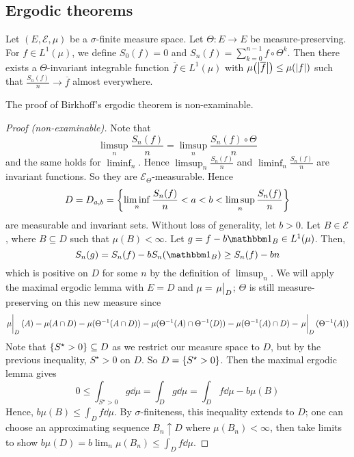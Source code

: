 \subsection{Ergodic theorems}
\begin{theorem}[Birkhoff]
	Let \( (E, \mathcal E, \mu) \) be a \( \sigma \)-finite measure space.
	Let \( \Theta \colon E \to E \) be measure-preserving.
	For \( f \in L^1(\mu) \), we define \( S_0(f) = 0 \) and \( S_n(f) = \sum_{k=0}^{n-1} f \circ \Theta^k \).
	Then there exists a \( \Theta \)-invariant integrable function \( \overline f \in L^1(\mu) \) with \( \mu\qty(\abs{\overline f}) \leq \mu(\abs{f}) \) such that \( \frac{S_n(f)}{n} \to \overline f \) almost everywhere.
\end{theorem}
The proof of Birkhoff's ergodic theorem is non-examinable.
\begin{proof}[Proof (non-examinable)]
    Note that
    \[ \limsup_n \frac{S_n(f)}{n} =  \limsup_n \frac{S_n(f) \circ \Theta}{n} \]
    and the same holds for \( \liminf_n \).
    Hence \( \limsup_n \frac{S_n(f)}{n} \) and \( \liminf_n \frac{S_n(f)}{n} \) are invariant functions.
    So they are \( \mathcal E_\Theta \)-measurable.
    Hence
    \[ D = D_{a,b} = \qty{\liminf_n \frac{S_n(f)}{n} < a < b < \limsup_n \frac{S_n(f)}{n}} \]
    are measurable and invariant sets.
    Without loss of generality, let \( b > 0 \).
    Let \( B \in \mathcal E \), where \( B \subseteq D \) such that \( \mu(B) < \infty \).
    Let \( g = f - b\mathbbm 1_B \in L^1(\mu) \).
    Then,
    \[ S_n(g) = S_n(f) - bS_n(\mathbbm 1_B) \geq S_n(f) - bn \]
    which is positive on \( D \) for some \( n \) by the definition of \( \limsup_n \).
    We will apply the maximal ergodic lemma with \( E = D \) and \( \mu = \eval{\mu}_D \); \( \Theta \) is still measure-preserving on this new measure since
    \[ \eval{\mu}_D(A) = \mu(A \cap D) = \mu(\Theta^{-1}(A \cap D)) = \mu(\Theta^{-1}(A) \cap \Theta^{-1}(D)) = \mu(\Theta^{-1}(A) \cap D) = \eval{\mu}_D(\Theta^{-1}(A)) \]
    Note that \( \qty{S^\star > 0} \subseteq D \) as we restrict our measure space to \( D \), but by the previous inequality, \( S^\star > 0 \) on \( D \).
    So \( D = \qty{S^\star > 0} \).
    Then the maximal ergodic lemma gives
    \[ 0 \leq \int_{S^\star > 0} g \dd{\mu} = \int_D g \dd{\mu} = \int_D f \dd{\mu} - b \mu(B) \]
    Hence, \( b \mu(B) \leq \int_D f \dd{\mu} \).
    By \( \sigma \)-finiteness, this inequality extends to \( D \); one can choose an approximating sequence \( B_n \uparrow D \) where \( \mu(B_n) < \infty \), then take limits to show \( b\mu(D) = b \lim_n \mu(B_n) \leq \int_D f \dd{\mu} \).

\end{proof}
